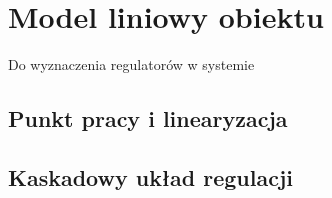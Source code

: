 \chapter{Model liniowy obiektu}
\label{cha:ch5_model_liniowy}

Do wyznaczenia regulatorów w systemie 

\section{Punkt pracy i linearyzacja}
\label{sec:ch5_punkt_pracy_linearyzacja}

\section{Kaskadowy układ regulacji}
\label{sec:ch5_kaskadowy_uklad_regulacji}

